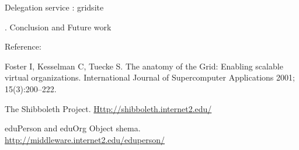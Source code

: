 \documentclass{article}
\begin{document}
Delegation service : gridsite


\bigskip


\bigskip

{. Conclusion and Future work
\par}


\bigskip


\bigskip

Reference:

Foster I, Kesselman C, Tuecke S. The anatomy of the Grid: Enabling
scalable virtual organizations. International Journal of Supercomputer
Applications 2001; 15(3):200--222. 


\bigskip

The Shibboleth Project.
\href{http://shibboleth.internet2.edu/}{Http://shibboleth.internet2.edu/}


\bigskip

eduPerson and eduOrg Object shema.
\url{http://middleware.internet2.edu/eduperson/}


\bigskip
\end{document}
